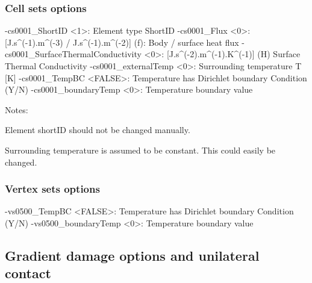 \documentclass[10pt,oneside]{memoir}
\begin{document}
\subsubsection{Cell sets options}
\small{\begin{boxedverbatim}
-cs0001_ShortID <1>: Element type ShortID 
-cs0001_Flux <0>: [J.s^(-1).m^(-3) / J.s^(-1).m^(-2)] (f): Body / surface heat flux 
-cs0001_SurfaceThermalConductivity <0>: [J.s^(-2).m^(-1).K^(-1)]
                                        (H) Surface Thermal Conductivity 
-cs0001_externalTemp <0>: Surrounding temperature T [K] 
-cs0001_TempBC <FALSE>:   Temperature has Dirichlet boundary Condition (Y/N) 
-cs0001_boundaryTemp <0>: Temperature boundary value 
\end{boxedverbatim}}
Notes:
\begin{compactenum}
\item Element shortID should not be changed manually. 
\item Surrounding temperature is assumed to be constant. This could easily be changed.
\end{compactenum}

\subsubsection{Vertex sets options}
\small{\begin{boxedverbatim}
-vs0500_TempBC <FALSE>:   Temperature has Dirichlet boundary Condition (Y/N) 
-vs0500_boundaryTemp <0>: Temperature boundary value 
\end{boxedverbatim}}

\subsection{Gradient damage options and unilateral contact}
\end{document}

